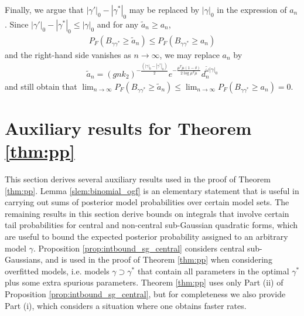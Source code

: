 Finally, we argue that $|\gamma'|_0 - |\gamma^*|_0$ may be replaced by $|\gamma|_0$ in the expression of $a_n$.
Since $|\gamma'|_0 - |\gamma^*|_0 \leq |\gamma|_0$ and for any $\tilde{a}_n \geq a_n$, 
\begin{align}
 P_F \left( B_{\gamma \gamma^*} \geq \tilde{a}_n \right) \leq P_F \left( B_{\gamma \gamma^*} \geq a_n \right) 
\nonumber
\end{align}
and the right-hand side vanishes as $n \rightarrow \infty$, we may replace $a_n$ by
\begin{align}
\tilde{a}_n= 
\left( gnk_2 \right)^{-\frac{(|\gamma|_0-|\gamma^*|_0)}{2}} e^{-\frac{\mu^T\mu (1-\delta)}{2 \log \mu^T\mu}} d_n^{\tilde{\omega} |\gamma|_0}
\nonumber
\end{align}
and still obtain that
$\lim_{n \rightarrow \infty} P_F \left( B_{\gamma \gamma^*} \geq \tilde{a}_n \right) \leq \lim_{n \rightarrow \infty} P_F \left( B_{\gamma \gamma^*} \geq a_n \right) = 0$.


\newpage
\section{Auxiliary results for Theorem \ref{thm:pp}}
\label{supplsec:aux_pp}


This section derives several auxiliary results used in the proof of Theorem \ref{thm:pp}.
Lemma \ref{slem:binomial_ogf} is an elementary statement that is useful in carrying out sums of posterior model probabilities over certain model sets.
The remaining results in this section derive bounds on integrals that involve certain tail probabilities for central and non-central sub-Gaussian quadratic forms, which are useful to bound the expected posterior probability assigned to an arbitrary model $\gamma$.
Proposition \ref{prop:intbound_sg_central} considers central sub-Gaussians, and is used in the proof of Theorem \ref{thm:pp} when considering overfitted models, i.e. models $\gamma \supset \gamma^*$ that contain all parameters in the optimal $\gamma^*$ plus some extra spurious parameters.
Theorem \ref{thm:pp} uses only Part (ii) of Proposition \ref{prop:intbound_sg_central}, but for completeness we also provide Part (i), which considers a situation where one obtains faster rates.

